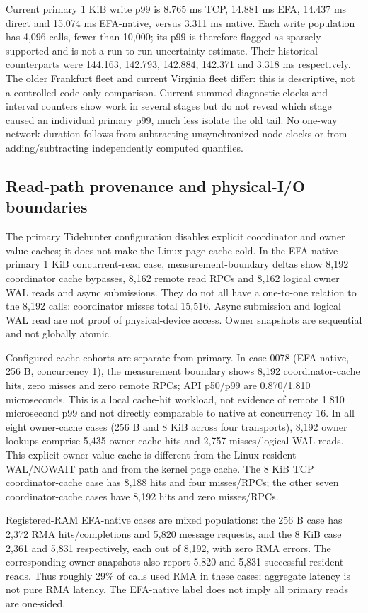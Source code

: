 Current primary 1 KiB write p99 is 8.765 ms TCP, 14.881 ms EFA, 14.437 ms direct and 15.074 ms EFA-native, versus 3.311 ms native. Each write population has 4,096 calls, fewer than 10,000; its p99 is therefore flagged as sparsely supported and is not a run-to-run uncertainty estimate. Their historical counterparts were 144.163, 142.793, 142.884, 142.371 and 3.318 ms respectively. The older Frankfurt fleet and current Virginia fleet differ: this is descriptive, not a controlled code-only comparison. Current summed diagnostic clocks and interval counters show work in several stages but do not reveal which stage caused an individual primary p99, much less isolate the old tail. No one-way network duration follows from subtracting unsynchronized node clocks or from adding/subtracting independently computed quantiles.

\subsection{Read-path provenance and physical-I/O boundaries}\label{obs-cache}
The primary Tidehunter configuration disables explicit coordinator and owner value caches; it does not make the Linux page cache cold. In the EFA-native primary 1 KiB concurrent-read case, measurement-boundary deltas show 8,192 coordinator cache bypasses, 8,162 remote read RPCs and 8,162 logical owner WAL reads and async submissions. They do not all have a one-to-one relation to the 8,192 calls: coordinator misses total 15,516. Async submission and logical WAL read are not proof of physical-device access. Owner snapshots are sequential and not globally atomic.

Configured-cache cohorts are separate from primary. In case 0078 (EFA-native, 256 B, concurrency 1), the measurement boundary shows 8,192 coordinator-cache hits, zero misses and zero remote RPCs; API p50/p99 are 0.870/1.810 microseconds. This is a local cache-hit workload, not evidence of remote 1.810 microsecond p99 and not directly comparable to native at concurrency 16. In all eight owner-cache cases (256 B and 8 KiB across four transports), 8,192 owner lookups comprise 5,435 owner-cache hits and 2,757 misses/logical WAL reads. This explicit owner value cache is different from the Linux resident-WAL/NOWAIT path and from the kernel page cache. The 8 KiB TCP coordinator-cache case has 8,188 hits and four misses/RPCs; the other seven coordinator-cache cases have 8,192 hits and zero misses/RPCs.

Registered-RAM EFA-native cases are mixed populations: the 256 B case has 2,372 RMA hits/completions and 5,820 message requests, and the 8 KiB case 2,361 and 5,831 respectively, each out of 8,192, with zero RMA errors. The corresponding owner snapshots also report 5,820 and 5,831 successful resident reads. Thus roughly 29\% of calls used RMA in these cases; aggregate latency is not pure RMA latency. The EFA-native label does not imply all primary reads are one-sided.

